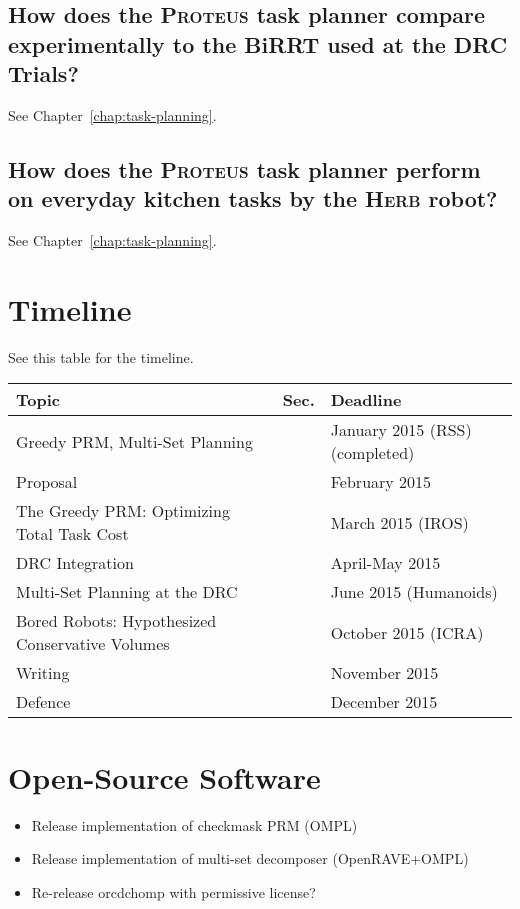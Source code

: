{\subsection{How does the \textsc{Proteus} task planner
   compare experimentally to the BiRRT used at the DRC Trials?}
\label{ques:drc-compare}

See Chapter~\ref{chap:task-planning}.

\subsection{How does the \textsc{Proteus} task planner
   perform on everyday kitchen tasks by the \textsc{Herb} robot?}
\label{ques:herb-performance}

See Chapter~\ref{chap:task-planning}.

}%

\section{Timeline}

See this table for the timeline.

\begin{center}
\begin{tabular}{lll}
\hline
Topic & Sec. & Deadline \\
\hline
Greedy PRM, Multi-Set Planning & & January 2015 (RSS) (completed) \\
Proposal & & February 2015 \\
The Greedy PRM: Optimizing Total Task Cost & & March 2015 (IROS) \\
DRC Integration & & April-May 2015 \\
Multi-Set Planning at the DRC & & June 2015 (Humanoids) \\
Bored Robots: Hypothesized Conservative Volumes & & October 2015 (ICRA) \\
Writing & & November 2015 \\
Defence & & December 2015 \\
\hline
\end{tabular}
\end{center}

\section{Open-Source Software}

\begin{itemize}
\item Release implementation of checkmask PRM (OMPL)
\item Release implementation of multi-set decomposer (OpenRAVE+OMPL)
\item Re-release orcdchomp with permissive license?
\end{itemize}
